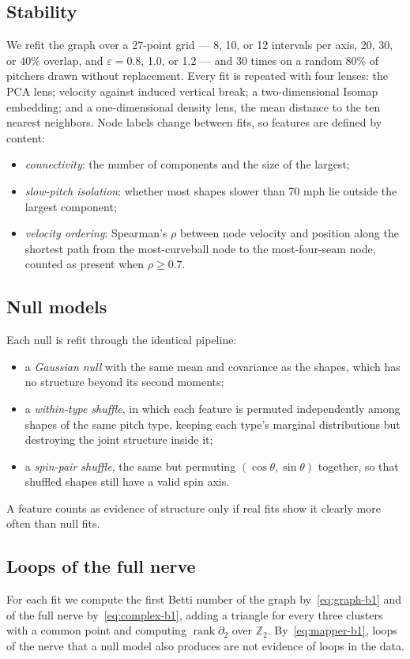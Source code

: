 \documentclass{article}
\newcommand{\Z}{\mathbb{Z}}
\DeclareMathOperator{\rank}{rank}
\theoremstyle{definition}
\theoremstyle{remark}
\begin{document}
\subsection{Stability}
We refit the graph over a 27-point grid --- 8, 10, or 12 intervals per axis, 20, 30, or 40\% overlap, and $\varepsilon = 0.8$, 1.0, or 1.2 --- and 30 times on a random 80\% of pitchers drawn without replacement.
Every fit is repeated with four lenses: the PCA lens; velocity against induced vertical break; a two-dimensional Isomap embedding; and a one-dimensional density lens, the mean distance to the ten nearest neighbors.
Node labels change between fits, so features are defined by content:
\begin{itemize}
  \item \emph{connectivity}: the number of components and the size of the largest;
  \item \emph{slow-pitch isolation}: whether most shapes slower than 70 mph lie outside the largest component;
  \item \emph{velocity ordering}: Spearman's $\rho$ between node velocity and position along the shortest path from the most-curveball node to the most-four-seam node, counted as present when $\rho \ge 0.7$.
\end{itemize}

\subsection{Null models}
Each null is refit through the identical pipeline:
\begin{itemize}
  \item a \emph{Gaussian null} with the same mean and covariance as the shapes, which has no structure beyond its second moments;
  \item a \emph{within-type shuffle}, in which each feature is permuted independently among shapes of the same pitch type, keeping each type's marginal distributions but destroying the joint structure inside it;
  \item a \emph{spin-pair shuffle}, the same but permuting $(\cos\theta, \sin\theta)$ together, so that shuffled shapes still have a valid spin axis.
\end{itemize}
A feature counts as evidence of structure only if real fits show it clearly more often than null fits.

\subsection{Loops of the full nerve}
For each fit we compute the first Betti number of the graph by~\eqref{eq:graph-b1} and of the full nerve by~\eqref{eq:complex-b1}, adding a triangle for every three clusters with a common point and computing $\rank \partial_2$ over $\Z_2$.
By~\eqref{eq:mapper-b1}, loops of the nerve that a null model also produces are not evidence of loops in the data.
\end{document}
